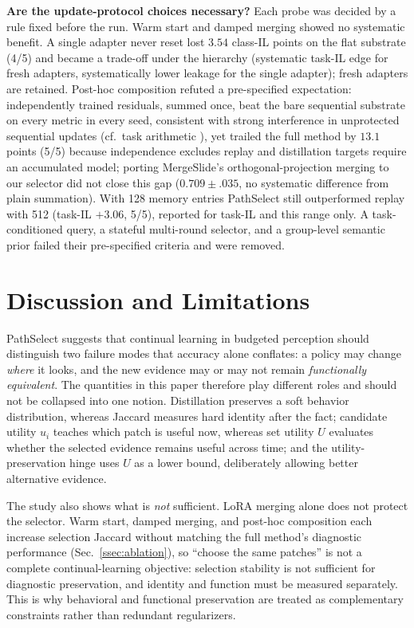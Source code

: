 \documentclass{article}
\begin{document}
\textbf{Are the update-protocol choices necessary?}
Each probe was decided by a rule fixed before the run. Warm start and damped merging showed no systematic benefit. A single adapter never reset lost $3.54$ class-IL points on the flat substrate (4/5) and became a trade-off under the hierarchy (systematic task-IL edge for fresh adapters, systematically lower leakage for the single adapter); fresh adapters are retained. Post-hoc composition refuted a pre-specified expectation: independently trained residuals, summed once, beat the bare sequential substrate on every metric in every seed, consistent with strong interference in unprotected sequential updates (cf.\ task arithmetic \cite{ilharco2023task}), yet trailed the full method by $13.1$ points (5/5) because independence excludes replay and distillation targets require an accumulated model; porting MergeSlide's orthogonal-projection merging \cite{bui2026mergeslide} to our selector did not close this gap ($0.709{\pm}.035$, no systematic difference from plain summation). With 128 memory entries PathSelect still outperformed replay with 512 (task-IL $+3.06$, 5/5), reported for task-IL and this range only. A task-conditioned query, a stateful multi-round selector, and a group-level semantic prior failed their pre-specified criteria and were removed.

\FloatBarrier
\section{Discussion and Limitations}
\label{sec:discussion}

PathSelect suggests that continual learning in budgeted perception should distinguish two failure modes that accuracy alone conflates: a policy may change \emph{where} it looks, and the new evidence may or may not remain \emph{functionally equivalent}. The quantities in this paper therefore play different roles and should not be collapsed into one notion. Distillation preserves a soft behavior distribution, whereas Jaccard measures hard identity after the fact; candidate utility $u_i$ teaches which patch is useful now, whereas set utility $U$ evaluates whether the selected evidence remains useful across time; and the utility-preservation hinge uses $U$ as a lower bound, deliberately allowing better alternative evidence.

The study also shows what is \emph{not} sufficient. LoRA merging alone does not protect the selector. Warm start, damped merging, and post-hoc composition each increase selection Jaccard without matching the full method's diagnostic performance (Sec.~\ref{ssec:ablation}), so ``choose the same patches'' is not a complete continual-learning objective: selection stability is not sufficient for diagnostic preservation, and identity and function must be measured separately. This is why behavioral and functional preservation are treated as complementary constraints rather than redundant regularizers.
\end{document}
